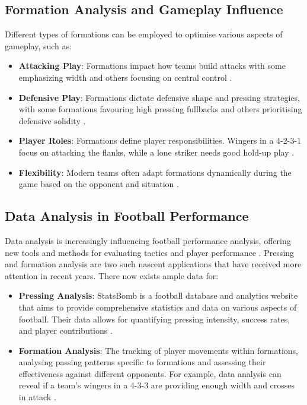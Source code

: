 \documentclass[12pt]{article}
\begin{document}
\subsection{Formation Analysis and Gameplay Influence}
Different types of formations can be employed to optimise various aspects of gameplay, such as:
\begin{itemize}
    \item \textbf{Attacking Play}: Formations impact how teams build attacks with some emphasizing width and others focusing on central control \citep{bauer_putting_2023}.
    \item \textbf{Defensive Play}: Formations dictate defensive shape and pressing strategies, with some formations favouring high pressing fullbacks and others prioritising defensive solidity \citep{bauer_putting_2023}.
    \item \textbf{Player Roles}: Formations define player responsibilities. Wingers in a 4-2-3-1 focus on attacking the flanks, while a lone striker needs good hold-up play \citep{bauer_putting_2023}.
    \item \textbf{Flexibility}: Modern teams often adapt formations dynamically during the game based on the opponent and situation \citep{bauer_putting_2023}.
\end{itemize}

\subsection{Data Analysis in Football Performance}
Data analysis is increasingly influencing football performance analysis, offering new tools and methods for evaluating tactics and player performance \citep{link_data_2018}. Pressing and formation analysis are two such nascent applications that have received more attention in recent years. There now exists ample data for:
\begin{itemize}
    \item \textbf{Pressing Analysis}: StatsBomb is a football database and analytics website that aims to provide comprehensive statistics and data on various aspects of football. Their data allows for quantifying pressing intensity, success rates, and player contributions \citep{morgan_will_how_2018}.
    \item \textbf{Formation Analysis}: The tracking of player movements within formations, analysing passing patterns specific to formations and assessing their effectiveness against different opponents. For example, data analysis can reveal if a team's wingers in a 4-3-3 are providing enough width and crosses in attack \cite{goes_unlocking_2021}.
\end{itemize}
\end{document}

